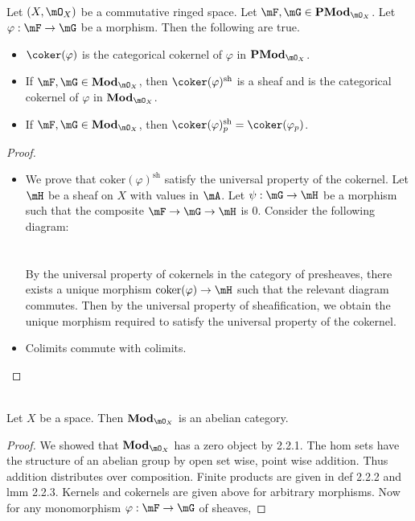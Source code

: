 \documentclass[a4paper]{article}
\begin{document}
\begin{prp}{}{}\\
Let $(X,\mO_X)$ be a commutative ringed space. Let $\mF,\mG\in\bold{PMod}_{\mO_X}$. Let $\varphi:\mF\to\mG$ be a morphism. Then the following are true. 
\begin{itemize}
\item $\coker(\varphi)$ is the categorical cokernel of $\varphi$ in $\bold{PMod}_{\mO_X}$. 
\item If $\mF,\mG\in\bold{Mod}_{\mO_X}$, then $\coker(\varphi)^\text{sh}$ is a sheaf and is the categorical cokernel of $\varphi$ in $\bold{Mod}_{\mO_X}$. 
\item If $\mF,\mG\in\bold{Mod}_{\mO_X}$, then $\coker(\varphi)_p^\text{sh}=\coker(\varphi_p)$. 
\end{itemize}
\begin{proof}\\
\begin{itemize}
\item We prove that $\text{coker}(\varphi)^\text{sh}$ satisfy the universal property of the cokernel. Let $\mH$ be a sheaf on $X$ with values in $\mA$. Let $\psi:\mG\to\mH$ be a morphism such that the composite $\mF\to\mG\to\mH$ is $0$. Consider the following diagram: \\
 \\~\\
By the universal property of cokernels in the category of presheaves, there exists a unique morphism $\text{coker}(\varphi)\to\mH$ such that the relevant diagram commutes. Then by the universal property of sheafification, we obtain the unique morphism required to satisfy the universal property of the cokernel. 
\item Colimits commute with colimits. 
\end{itemize}
\end{proof}
\end{prp}

\begin{prp}{}{}\\
Let $X$ be a space. Then $\bold{Mod}_{\mO_X}$ is an abelian category. 
\begin{proof}
We showed that $\bold{Mod}_{\mO_X}$ has a zero object by 2.2.1. The hom sets have the structure of an abelian group by open set wise, point wise addition. Thus addition distributes over composition. Finite products are given in def 2.2.2 and lmm 2.2.3. Kernels and cokernels are given above for arbitrary morphisms. Now for any monomorphism $\varphi:\mF\to\mG$ of sheaves, 
\end{proof}
\end{prp}
\end{document}
